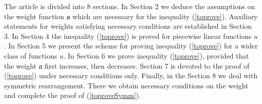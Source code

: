 The article is divided into 8 sections.
In Section 2 we deduce the assumptions on the weight function $\mathfrak a$ which are necessary for the 
inequality (\ref{toprove}).
Auxiliary statements for weights satisfying necessary conditions are established in Section 3.
In Section 4 the inequality (\ref{toprove}) is proved for piecewise linear functions $u$.
In Section 5 we present the scheme for proving inequality (\ref{toprove}) for a wider class of 
functions $u$.
In Section 6 we prove inequality (\ref{toprove}), provided that the weight $\mathfrak a$ first increases, 
then decreases.
Section 7 is devoted to the proof of (\ref{toprove}) under necessary conditions only.
Finally, in the Section 8 we deal with symmetric rearrangement.
There we obtain necessary conditions on the weight and complete the proof of (\ref{toproveSymm}).
